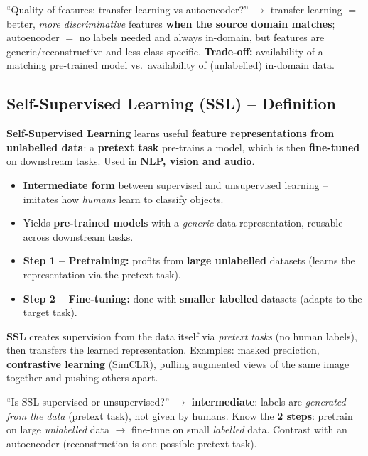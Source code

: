 \documentclass[10pt,a4paper]{article}
\begin{document}
	\begin{examtipbox}
		``Quality of features: transfer learning vs autoencoder?'' $\to$ transfer learning $=$ better, \emph{more discriminative} features \textbf{when the source domain matches}; autoencoder $=$ no labels needed and always in-domain, but features are generic/reconstructive and less class-specific. \textbf{Trade-off:} availability of a matching pre-trained model vs.\ availability of (unlabelled) in-domain data.
	\end{examtipbox}

	\subsection{Self-Supervised Learning (SSL) -- Definition}

	\begin{definitionbox}
		\textbf{Self-Supervised Learning} learns useful \textbf{feature representations from unlabelled data}: a \textbf{pretext task} pre-trains a model, which is then \textbf{fine-tuned} on downstream tasks. Used in \textbf{NLP, vision and audio}.
	\end{definitionbox}

	\begin{itemize}[leftmargin=*]
		\item \textbf{Intermediate form} between supervised and unsupervised learning -- imitates how \emph{humans} learn to classify objects.
		\item Yields \textbf{pre-trained models} with a \emph{generic} data representation, reusable across downstream tasks.
		\item \textbf{Step 1 -- Pretraining:} profits from \textbf{large unlabelled} datasets (learns the representation via the pretext task).
		\item \textbf{Step 2 -- Fine-tuning:} done with \textbf{smaller labelled} datasets (adapts to the target task).
	\end{itemize}

	\begin{importantbox}
		\textbf{SSL} creates supervision from the data itself via \emph{pretext tasks} (no human labels), then transfers the learned representation. Examples: masked prediction, \textbf{contrastive learning} (SimCLR), pulling augmented views of the same image together and pushing others apart.
	\end{importantbox}

	\begin{examtipbox}
		``Is SSL supervised or unsupervised?'' $\to$ \textbf{intermediate}: labels are \emph{generated from the data} (pretext task), not given by humans. Know the \textbf{2 steps}: pretrain on large \emph{unlabelled} data $\to$ fine-tune on small \emph{labelled} data. Contrast with an autoencoder (reconstruction is one possible pretext task).
	\end{examtipbox}
\end{document}
